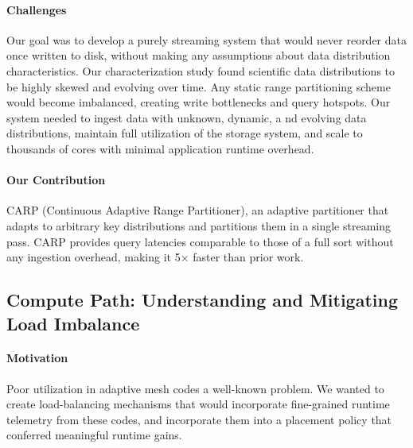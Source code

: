 \paragraph{Challenges}
Our goal was to develop a purely streaming system that would never reorder data once written to
disk, without making any assumptions about data distribution characteristics.
Our characterization study found scientific data distributions to be highly skewed and evolving
over time.
Any static range partitioning scheme would become imbalanced, creating write bottlenecks and query
hotspots.
Our system needed to ingest data with unknown, dynamic, a nd evolving data distributions, maintain
full utilization of the storage system, and scale to thousands of cores with minimal application
runtime overhead.

\paragraph{Our Contribution}
CARP (Continuous Adaptive Range Partitioner), an adaptive partitioner that adapts to arbitrary key
distributions and partitions them in a single streaming pass.
CARP provides query latencies comparable to those of a full sort without any ingestion overhead,
making it 5$\times$ faster than prior work.


\subsection{Compute Path: Understanding and Mitigating Load Imbalance}

\paragraph{Motivation}
Poor utilization in adaptive mesh codes a well-known problem.
We wanted to create load-balancing mechanisms that would incorporate fine-grained runtime telemetry
from these codes, and incorporate them into a placement policy that conferred meaningful runtime
gains.

